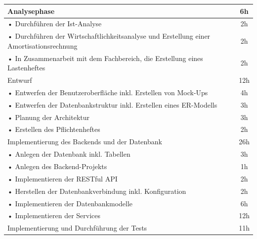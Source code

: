 \documentclass[a4paper,12pt]{article}
\begin{document}
\begin{tabular}{|p{\textwidth}|c|}
    \hline
    \rowcolor{gray}Analysephase & 6h \\
    \hline
    \hspace{0.5cm}• Durchführen der Ist-Analyse &2h \\
    \hline
    \hspace{0.5cm}• Durchführen der Wirtschaftlichkeitsanalyse und Erstellung einer Amortisationsrechnung & 2h \\
    \hline
    \hspace{0.5cm}• In Zusammenarbeit mit dem Fachbereich, die Erstellung eines Lastenheftes  & 2h \\
    \hline
    \rowcolor{gray}Entwurf & 12h \\
    \hline
    \hspace{0.5cm}• Entwerfen der Benutzeroberfläche inkl. Erstellen von Mock-Ups & 4h \\
    \hline
    \hspace{0.5cm}• Entwerfen der Datenbankstruktur inkl. Erstellen eines ER-Modells & 3h \\
    \hline
    \hspace{0.5cm}• Planung der Architektur  & 3h \\
    \hline
    \hspace{0.5cm}• Erstellen des Pflichtenheftes & 2h \\
    \hline
    \rowcolor{gray}Implementierung des Backends und der Datenbank & 26h \\
    \hline
    \hspace{0.5cm}• Anlegen der Datenbank inkl. Tabellen & 3h \\
    \hline
    \hspace{0.5cm}• Anlegen des Backend-Projekts & 1h \\
    \hline
    \hspace{0.5cm}• Implementieren der RESTful API & 2h \\
    \hline
    \hspace{0.5cm}• Herstellen der Datenbankverbindung inkl. Konfiguration & 2h \\
    \hline
    \hspace{0.5cm}• Implementieren der Datenbankmodelle & 6h \\
    \hline
    \hspace{0.5cm}• Implementieren der Services & 12h \\
    \hline
    \rowcolor{gray}Implementierung und Durchführung der Tests & 11h \\

\end{tabular}
\end{document}
